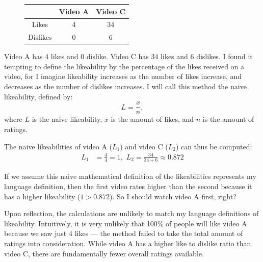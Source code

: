 \documentclass[a4paper,11pt]{article}
\begin{document}
\begin{figure}[H]
    \centering
    \begin{tabular}{c|c|c}
        & Video A & Video C \\
        \hline
        \hline
        Likes & 4 & 34\\
        \hline
        Dislikes & 0 & 6
    \end{tabular}
    \label{tbl:ex}
\end{figure}



Video A has 4 likes and 0 dislike. Video C has 34 likes and 6 dislikes. I found it tempting to define the likeability by the percentage of the likes received on a video, for I imagine likeability increases as the number of likes increase, and decreases as the number of dislikes increases. I will call this method the naive likeability, defined by:
\[
    L = \frac{x}{n},
\]
where $L$ is the naive likeability, $x$ is the amount of likes, and $n$ is the amount of ratings.

The naive likeabilities of video A ($L_1$) and video C ($L_2$) can thus be computed:
\begin{align*}
    L_{1} &= \frac{4}{4} = 1, \,\, L_{2} = \frac{34}{34 + 6} \approx 0.872
\end{align*}

If we assume this naive mathematical definition of the likeabilities represents my language definition, then the first video rates higher than the second because it has a higher likeability ($1 > 0.872$). So I should watch video A first, right?

Upon reflection, the calculations are unlikely to match my language definitions of likeability. Intuitively, it is very unlikely that 100\% of people will like video A because we saw just 4 likes --- the method failed to take the total amount of ratings into consideration. While video A has a higher like to dislike ratio than video C, there are fundamentally fewer overall ratings available.
\end{document}
